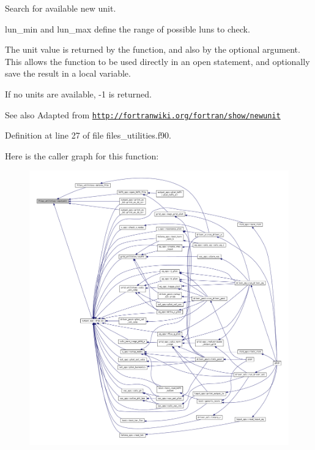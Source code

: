 Search for available new unit. 

{\ttfamily lun\+\_\+min} and {\ttfamily lun\+\_\+max} define the range of possible luns to check.

The unit value is returned by the function, and also by the optional argument. This allows the function to be used directly in an open statement, and optionally save the result in a local variable.

If no units are available, -\/1 is returned.

\begin{DoxySeeAlso}{See also}
Adapted from \href{http://fortranwiki.org/fortran/show/newunit}{\tt http\+://fortranwiki.\+org/fortran/show/newunit} 
\end{DoxySeeAlso}


Definition at line 27 of file files\+\_\+utilities.\+f90.

Here is the caller graph for this function\+:\nopagebreak
\begin{figure}[H]
\begin{center}
\leavevmode
\includegraphics[width=350pt]{namespacefiles__utilities_ac6066df405564ba2f5e3c4bba726c1f8_icgraph}
\end{center}
\end{figure}
\mbox{\label{namespacefiles__utilities_ac5befac3b753b28003e6878bec2af381}} 
